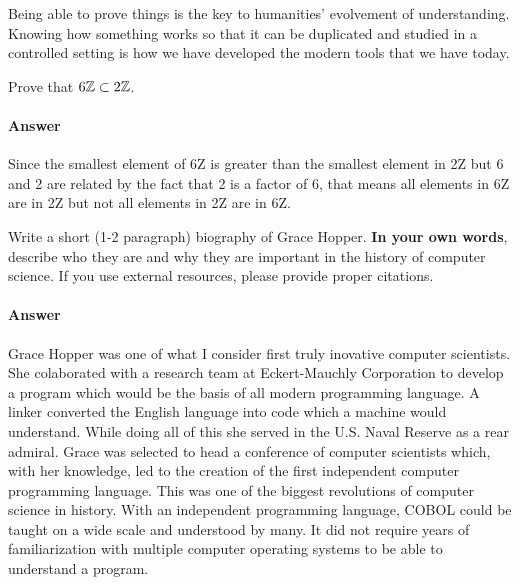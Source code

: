 \documentclass{article}
\begin{document}
Being able to prove things is the key to humanities' evolvement of understanding. Knowing how something works so that it can be duplicated and studied in a controlled setting is how we have developed the modern tools that we have today. 



Prove that $6{\mathbb Z} \subset 2{\mathbb Z}$.

\paragraph{Answer}

Since the smallest element of 6Z is greater than the smallest element in 2Z but 6 and 2 are related by the fact that 2 is a factor of 6, that means all elements in 6Z are in 2Z but not all elements in 2Z are in 6Z.


Write a short (1-2 paragraph) biography of Grace Hopper.
\textbf{In your own words}, describe who they are and why they are important in
the history of computer science.  If you use external resources, please provide
proper citations.

\paragraph{Answer}

Grace Hopper was one of what I consider first truly inovative computer scientists. She colaborated with a research team at Eckert-Mauchly Corporation to develop a program which would be the basis of all modern programming language. A linker converted the English language into code which a machine would understand. While doing all of this she served in the U.S. Naval Reserve as a rear admiral. Grace was selected to head a conference of computer scientists which, with her knowledge, led to the creation of the first independent computer programming language. This was one of the biggest revolutions of computer science in history. With an independent programming language, COBOL could be taught on a wide scale and understood by many. It did not require years of familiarization with multiple computer operating systems to be able to understand a program.
\end{document}
